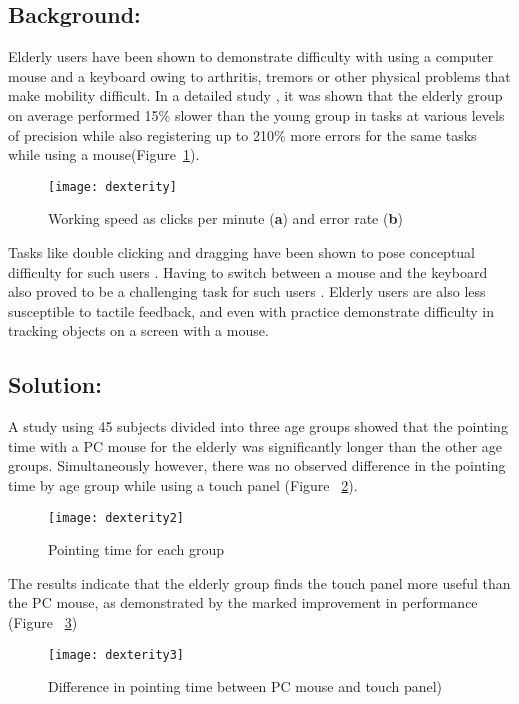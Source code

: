 \documentclass[12pt,draftcls,onecolumn]{IEEEtran}
\begin{document}
\subsection{Background:}
Elderly users have been shown to demonstrate difficulty with using a computer mouse and a keyboard owing to arthritis, tremors or other physical problems that make mobility difficult. 
In a detailed study \cite{laursen2001performance}, it was shown that the elderly group on average performed 15\% slower than the young group in tasks at various levels of precision while also registering up to 210\% more errors for the same tasks while using a mouse(Figure~\ref{dexterity}).
 \begin{figure}[!h]
\centering
\texttt{[image: dexterity]}
\caption{Working speed as clicks per minute (\textbf{a}) and error rate (\textbf{b})}
\label{dexterity}
\end{figure} 


 Tasks like double clicking and dragging have been shown to pose conceptual difficulty for such users \cite{hanson2001web}. Having to switch between a mouse and the keyboard also proved to be a challenging task for such users \cite{johnson2007designing}. Elderly users are also less susceptible to tactile feedback, and even with practice demonstrate difficulty in tracking objects on a screen with a mouse\cite{holzinger2007some}.

\subsection{Solution:}
A study \cite{1167982} using 45 subjects divided into three age groups showed that the pointing time with a PC mouse for the elderly was significantly longer than the other age groups. Simultaneously however, there was no observed difference in the pointing time by age group while using a touch panel (Figure ~\ref{dexterity2}).

 \begin{figure}[!h]
\centering
\texttt{[image: dexterity2]}
\caption{Pointing time for each group}
\label{dexterity2}
\end{figure} 

The results indicate that the elderly group finds the touch panel more useful than the PC mouse, as demonstrated by the marked improvement in performance (Figure ~\ref{dexterity3})

 \begin{figure}[!h]
\centering
\texttt{[image: dexterity3]}
\caption{Difference in pointing time between PC mouse and touch panel)}
\label{dexterity3}
\end{figure}
\end{document}
